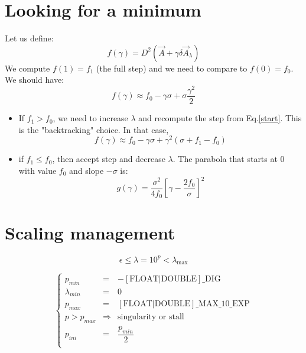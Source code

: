 \documentclass[aps,12pt]{revtex4}
\begin{document}
\section{Looking for a minimum}
Let us define:
\begin{equation}
	f(\gamma)  =  D^2(\vec{A}+\gamma \delta\vec{A}_\lambda)
\end{equation}
We compute $f(1)=f_1$ (the full step) and we need to compare to $f(0)=f_0$.
We should have:
\begin{equation}
	f(\gamma) \approx f_0 - \gamma \sigma + \sigma\dfrac{\gamma^2}{2} 
\end{equation}

\begin{itemize}
\item If $f_1>f_0$, we need to increase $\lambda$ and recompute the step from Eq.\eqref{start}. This is the "backtracking" choice.
In that case, 
\begin{equation}
		f(\gamma) \approx f_0 - \gamma \sigma + \gamma^2 \left(\sigma+f_1-f_0\right)
\end{equation}

\item if $f_1\leq f_0$, then accept step and decrease $\lambda$.
The parabola that starts at $0$ with value $f_0$ and slope $-\sigma$ is:
\begin{equation}
	g(\gamma) = \dfrac{\sigma^2}{4f_0}\left[\gamma - \dfrac{2f_0}{\sigma}\right]^2
\end{equation}
\end{itemize}

\section{Scaling management}

\begin{equation}
	\epsilon \leq \lambda = 10^p < \lambda_{\max}
\end{equation}

\begin{equation}
\left\lbrace
\begin{array}{lcl}
	p_{min}  & =  &-\mathrm{[FLOAT|DOUBLE]\_DIG}\\
	\lambda_{min} & = & 0\\
 	\hline
	p_{max} & = &  \mathrm{[FLOAT|DOUBLE]\_MAX\_10\_EXP}\\
	p>p_{max}& \Rightarrow & \text{singularity or stall}\\
	\hline
	p_{ini} & = & \dfrac{p_{min}}{2}\\
\end{array}
\right.
\end{equation}
\end{document}
